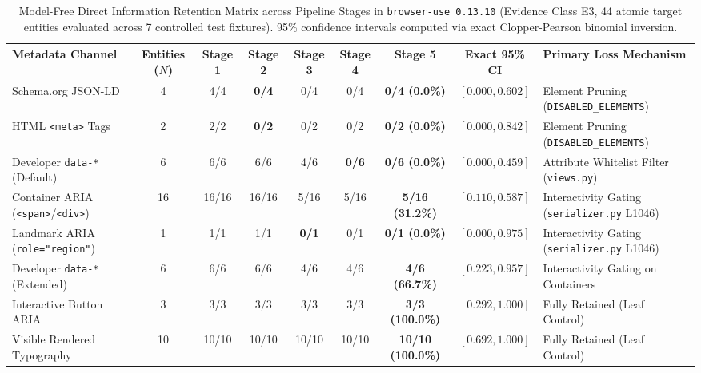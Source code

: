 \documentclass[conference]{IEEEtran}
\begin{document}
\begin{table}[t]
\centering
\footnotesize
\caption{Model-Free Direct Information Retention Matrix across Pipeline Stages in \texttt{browser-use 0.13.10} (Evidence Class E3, 44 atomic target entities evaluated across 7 controlled test fixtures). 95\% confidence intervals computed via exact Clopper-Pearson binomial inversion.}
\label{tab:retention_matrix}
\begin{tabular*}{\textwidth}{@{\extracolsep{\fill}}lcccccccl@{}}
\toprule
\textbf{Metadata Channel} & \textbf{Entities ($N$)} & \textbf{Stage 1} & \textbf{Stage 2} & \textbf{Stage 3} & \textbf{Stage 4} & \textbf{Stage 5} & \textbf{Exact 95\% CI} & \textbf{Primary Loss Mechanism} \\
\midrule
Schema.org JSON-LD & 4 & 4/4 & \textbf{0/4} & 0/4 & 0/4 & \textbf{0/4 (0.0\%)} & $[0.000, 0.602]$ & Element Pruning (\texttt{DISABLED\_ELEMENTS}) \\
HTML \texttt{<meta>} Tags & 2 & 2/2 & \textbf{0/2} & 0/2 & 0/2 & \textbf{0/2 (0.0\%)} & $[0.000, 0.842]$ & Element Pruning (\texttt{DISABLED\_ELEMENTS}) \\
Developer \texttt{data-*} (Default) & 6 & 6/6 & 6/6 & 4/6 & \textbf{0/6} & \textbf{0/6 (0.0\%)} & $[0.000, 0.459]$ & Attribute Whitelist Filter (\texttt{views.py}) \\
Container ARIA (\texttt{<span>}/\texttt{<div>}) & 16 & 16/16 & 16/16 & 5/16 & 5/16 & \textbf{5/16 (31.2\%)} & $[0.110, 0.587]$ & Interactivity Gating (\texttt{serializer.py} L1046) \\
Landmark ARIA (\texttt{role="region"}) & 1 & 1/1 & 1/1 & \textbf{0/1} & 0/1 & \textbf{0/1 (0.0\%)} & $[0.000, 0.975]$ & Interactivity Gating (\texttt{serializer.py} L1046) \\
Developer \texttt{data-*} (Extended) & 6 & 6/6 & 6/6 & 4/6 & 4/6 & \textbf{4/6 (66.7\%)} & $[0.223, 0.957]$ & Interactivity Gating on Containers \\
Interactive Button ARIA & 3 & 3/3 & 3/3 & 3/3 & 3/3 & \textbf{3/3 (100.0\%)} & $[0.292, 1.000]$ & Fully Retained (Leaf Control) \\
Visible Rendered Typography & 10 & 10/10 & 10/10 & 10/10 & 10/10 & \textbf{10/10 (100.0\%)} & $[0.692, 1.000]$ & Fully Retained (Leaf Control) \\
\bottomrule
\end{tabular*}
\end{table}
\end{document}
